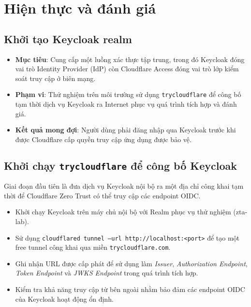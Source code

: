 \section{Hiện thực và đánh giá}
\subsection{Khởi tạo Keycloak realm}
\begin{itemize}
    \item \textbf{Mục tiêu}: Cung cấp một luồng xác thực tập trung, trong đó Keycloak đóng vai trò Identity Provider (IdP) còn Cloudflare Access đóng vai trò lớp kiểm soát truy cập ở biên mạng.
    \item \textbf{Phạm vi}: Thử nghiệm trên môi trường sử dụng \texttt{trycloudflare} để công bố tạm thời dịch vụ Keycloak ra Internet phục vụ quá trình tích hợp và đánh giá.
    \item \textbf{Kết quả mong đợi}: Người dùng phải đăng nhập qua Keycloak trước khi được Cloudflare cấp quyền truy cập ứng dụng được bảo vệ.
\end{itemize}

\subsection{Khởi chạy \texttt{trycloudflare} để công bố Keycloak}
Giai đoạn đầu tiên là đưa dịch vụ Keycloak nội bộ ra một địa chỉ công khai tạm thời để Cloudflare Zero Trust có thể truy cập các endpoint OIDC.
\begin{itemize}
    \item Khởi chạy Keycloak trên máy chủ nội bộ với Realm phục vụ thử nghiệm (zta-lab).
    \item Sử dụng \texttt{cloudflared tunnel --url http://localhost:<port>} để tạo một free tunnel công khai qua miền \texttt{trycloudflare.com}.
    \item Ghi nhận URL được cấp phát để sử dụng làm \textit{Issuer}, \textit{Authorization Endpoint}, \textit{Token Endpoint} và \textit{JWKS Endpoint} trong quá trình tích hợp.
    \item Kiểm tra khả năng truy cập từ bên ngoài nhằm bảo đảm các endpoint OIDC của Keycloak hoạt động ổn định.
\end{itemize}

